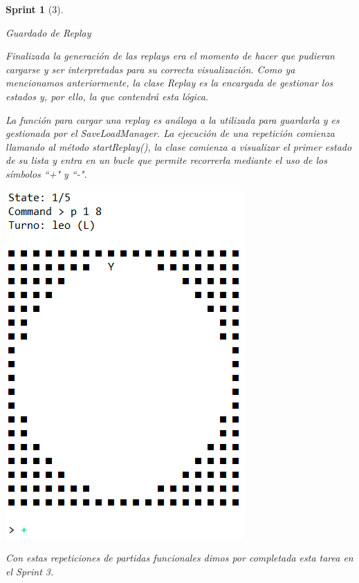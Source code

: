 \documentclass{article}
\theoremstyle{break}
\newtheorem*{sprint}{Sprint}
\begin{document}
\begin{sprint}[3]
\begin{center}
Guardado de Replay
\end{center}

Finalizada la generación de las \textit{replays} era el momento de hacer que pudieran cargarse y ser interpretadas para su correcta visualización. Como ya mencionamos anteriormente, la clase \textit{Replay} es la encargada de gestionar los estados y, por ello, la que contendrá esta lógica.

La función para cargar una \textit{replay} es análoga a la utilizada para guardarla y es gestionada por el \textit{SaveLoadManager}. La ejecución de una repetición comienza llamando al método \textit{startReplay()}, la clase comienza a visualizar el primer estado de su lista y entra en un bucle que permite recorrerla mediante el uso de los símbolos ``+" y ``-".

\begin{center}
\includegraphics[scale=0.7]{consola-replay-sprint-3.png}
\end{center}

Con estas repeticiones de partidas funcionales dimos por completada esta tarea en el Sprint 3.
\end{sprint}
\end{document}
